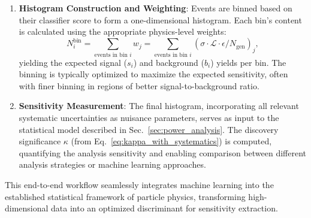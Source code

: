 \begin{enumerate}
    \item \textbf{Histogram Construction and Weighting}: Events are binned based on their classifier score to form a one-dimensional histogram. Each bin's content is calculated using the appropriate physics-level weights:
    \[
    N_i^{\text{bin}} = \sum_{\text{events in bin } i} w_j = \sum_{\text{events in bin } i} \left( \sigma \cdot \mathcal{L} \cdot \epsilon / N_{\text{gen}} \right)_j,
    \]
    yielding the expected signal ($s_i$) and background ($b_i$) yields per bin. The binning is typically optimized to maximize the expected sensitivity, often with finer binning in regions of better signal-to-background ratio.
    
    \item \textbf{Sensitivity Measurement}: The final histogram, incorporating all relevant systematic uncertainties as nuisance parameters, serves as input to the statistical model described in Sec.~\ref{sec:power_analysis}. The discovery significance $\kappa$ (from Eq.~\ref{eq:kappa_with_systematics}) is computed, quantifying the analysis sensitivity and enabling comparison between different analysis strategies or machine learning approaches.
\end{enumerate}

This end-to-end workflow seamlessly integrates machine learning into the established statistical framework of particle physics, transforming high-dimensional data into an optimized discriminant for sensitivity extraction.
